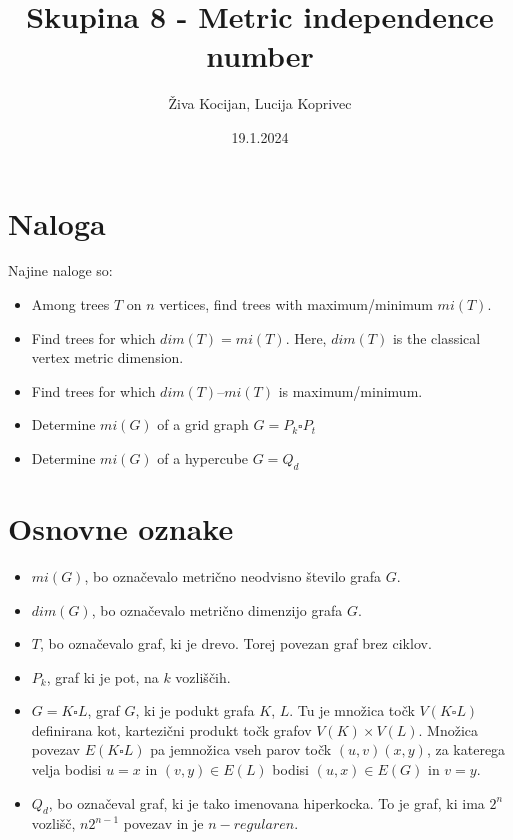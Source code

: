 \documentclass[a4paper]{article}
\title{Skupina 8 - Metric independence number}
\author{Živa Kocijan, Lucija Koprivec}
\date{19.1.2024}
\begin{document}
\maketitle

\section{Naloga}
Najine naloge so:
\begin{itemize}
  \item Among trees $T$ on $n$ vertices, find trees with maximum/minimum $mi(T)$.
  \item Find trees for which $dim(T) = mi(T)$. Here, $dim(T)$ is the classical vertex metric dimension.
  \item Find trees for which $dim(T)\text{--} mi(T)$ is maximum/minimum.
  \item Determine $mi(G)$ of a grid graph $G = P_{k} \square P_{t}$
  \item Determine $mi(G)$ of a hypercube $G = Q_{d}$
\end{itemize}

\section{Osnovne oznake}
\begin{itemize}
  \item $mi(G)$, bo označevalo metrično neodvisno število grafa $G$.
  \item $dim(G)$, bo označevalo metrično dimenzijo grafa $G$.
  \item $T$, bo označevalo graf, ki je drevo. Torej povezan graf brez ciklov.
  \item $P_{k}$, graf ki je pot, na $k$ vozliščih.
  \item $G = K \square L$, graf $G$, ki je podukt grafa $K$, $L$. Tu je množica točk $V(K \square L)$ definirana kot, kartezični  produkt točk grafov $V(K) \times V(L)$. Množica povezav $E(K \square L)$ pa jemnožica vseh parov točk $(u,v)(x,y)$, za katerega velja bodisi $u=x$ in $(v,y) \in E(L)$ bodisi $(u,x) \in E(G)$ in $v=y$.
  \item $Q_{d}$, bo označeval graf, ki je tako imenovana hiperkocka. To je graf, ki ima $2^{n}$ vozlišč, $n2^{n-1}$ povezav in je $n-regularen$.
\end{itemize}
\end{document}
